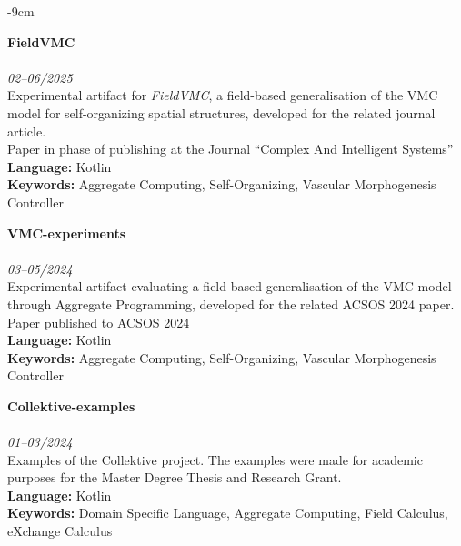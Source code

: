 \documentclass[10pt,a4paper]{altacv}
\begin{document}
\begin{adjustwidth}{}{-9cm}
   \divider

   \textcolor{accent}{\textbf{FieldVMC}}\\
   \\
   \textit{02--06/2025}\\ \smallskip
   Experimental artifact for \emph{FieldVMC}, a field-based generalisation of the VMC model for
   self-organizing spatial structures, developed for the related journal article.\\ \smallskip
   {\small \notesymbol \hspace{0.5em} Paper in phase of publishing at the Journal ``Complex And Intelligent Systems''}\\
   \textbf{Language:} Kotlin\\
   \textbf{Keywords:} Aggregate Computing, Self-Organizing, Vascular Morphogenesis Controller

    \divider

    \textcolor{accent}{\textbf{VMC-experiments}}\\
    \\
    \textit{03--05/2024}\\ \smallskip
    Experimental artifact evaluating a field-based generalisation of the VMC model through
    Aggregate Programming, developed for the related ACSOS 2024 paper.\\ \smallskip
    {\small \notesymbol \hspace{0.5em} Paper published to ACSOS 2024}\\
    \textbf{Language:} Kotlin\\
    \textbf{Keywords:} Aggregate Computing, Self-Organizing, Vascular Morphogenesis Controller

    \divider

    \textcolor{accent}{\textbf{Collektive-examples}}\\
    \\
    \textit{01--03/2024}\\ \smallskip
    Examples of the Collektive project. The examples were made for academic purposes for the Master Degree Thesis and Research Grant.\\ \smallskip
    \textbf{Language:} Kotlin\\
    \textbf{Keywords:} Domain Specific Language, Aggregate Computing, Field Calculus, eXchange Calculus


\end{adjustwidth}
\end{document}
